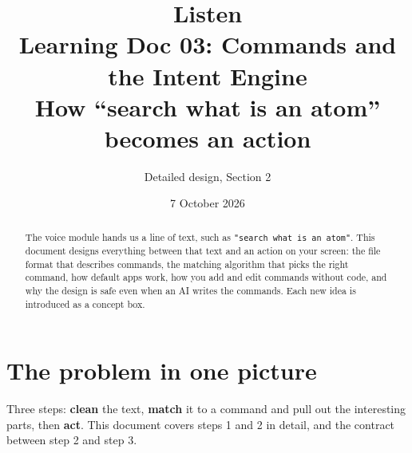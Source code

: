 \documentclass[11pt,a4paper]{article}
\title{\textbf{Listen}\\[4pt]\large Learning Doc 03: Commands and the Intent Engine\\
       \normalsize How ``search what is an atom'' becomes an action}
\author{Detailed design, Section 2}
\date{7 October 2026}
\begin{document}
\maketitle

\begin{abstract}
\noindent The voice module hands us a line of text, such as \texttt{"search what is an atom"}.
This document designs everything between that text and an action on your screen: the file
format that describes commands, the matching algorithm that picks the right command, how
default apps work, how you add and edit commands without code, and why the design is safe even
when an AI writes the commands. Each new idea is introduced as a concept box.
\end{abstract}

\tableofcontents
\newpage

\section{The problem in one picture}

\begin{center}
\end{center}

\noindent Three steps: \textbf{clean} the text, \textbf{match} it to a command and pull out the
interesting parts, then \textbf{act}. This document covers steps 1 and 2 in detail, and the
contract between step 2 and step 3.
\end{document}
